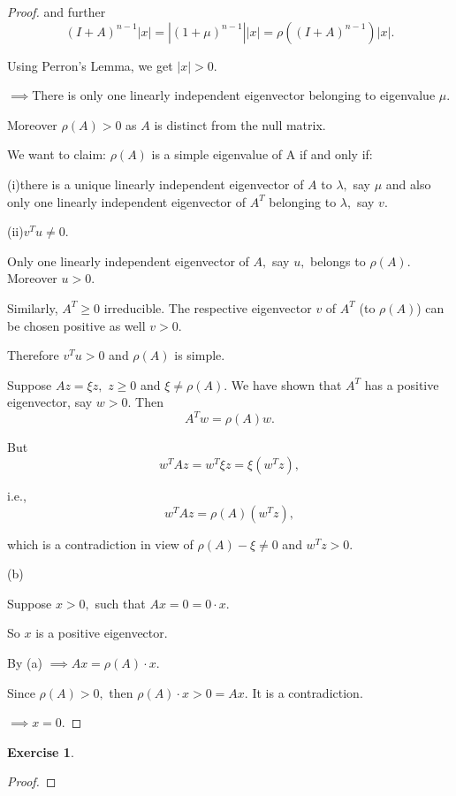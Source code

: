 \documentclass[11pt,a4paper]{article}
\renewcommand{\(}{\left(}
\renewcommand{\)}{\right)}
\newtheorem{exercise}{Exercise}
\begin{document}
\begin{proof}
  	
  	and further
  	\[
  	(I+A)^{n-1}\left\vert x\right\vert =\left\vert (1+\mu)^{n-1}\right\vert
  	\left\vert x\right\vert =\rho((I+A)^{n-1})\left\vert x\right\vert .
  	\]
  	
  	
  	Using Perron's Lemma, we get $\left\vert x\right\vert >0.$
  	
  	$\implies$There is only one linearly independent eigenvector belonging to
  	eigenvalue $\mu.$
  	
  	Moreover $\rho(A)>0$ as $A$ is distinct from the null matrix.
  	
  	We want to claim: $\rho(A)$ is a simple eigenvalue of A if and only if:
  	
  	(i)there is a unique linearly independent eigenvector of $A$ to $\lambda,$ say
  	$\mu$ and also only one linearly independent eigenvector of $A^{T}$ belonging
  	to $\lambda,$ say $v.$
  	
  	(ii)$v^{T}u\neq0.$
  	
  	Only one linearly independent eigenvector of $A,$ say $u,$ belongs to
  	$\rho(A).$ Moreover $u>0.$
  	
  	Similarly, $A^{T}\geq0$ irreducible. The respective eigenvector $v$ of $A^{T}$
  	(to $\rho(A)$) can be chosen positive as well $v>0.$
  	
  	Therefore $v^{T}u>0$ and $\rho(A)$ is simple.
  	
  	Suppose $Az=\xi z,$ $z\geq0$ and $\xi\neq\rho(A).$ We have shown that $A^{T}$
  	has a positive eigenvector, say $w>0.$ Then%
  	\[
  	A^{T}w=\rho(A)w.
  	\]
  	
  	
  	But
  	\[
  	w^{T}Az=w^{T}\xi z=\xi(w^{T}z),
  	\]
  	
  	
  	\bigskip i.e.,%
  	\[
  	w^{T}Az=\rho(A)(w^{T}z),
  	\]
  	
  	
  	which is a contradiction in view of $\rho(A)-\xi\neq0$ and $w^{T}z>0.$
  	
  	(b)
  	
  	Suppose $x>0,$ such that $Ax=0=0\cdot x.$
  	
  	So $x$ is a positive eigenvector.
  	
  	By (a) $\implies Ax=\rho(A)\cdot x.$
  	
  	Since $\rho(A)>0,$ then $\rho(A)\cdot x>0=Ax.$ It is a contradiction.
  	
  	$\implies x=0.$
  \end{proof}

  \begin{exercise}
  \end{exercise}  
  \begin{proof}
  	
  \end{proof}
\end{document}

